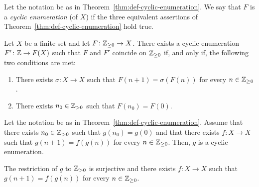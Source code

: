 Let the notation be as in Theorem~\ref{thm:def-cyclic-enumeration}.
We say that $F$ is a \emph{cyclic enumeration} (of $X$)
if the three equivalent assertions of Theorem~\ref{thm:def-cyclic-enumeration} hold true.



\begin{theorem}
  Let $X$ be a finite set and let $F\colon \mathbb{Z}_{\ge 0} \to X$.
  There exists a cyclic enumeration $F' \colon \mathbb{Z} \to F(X)$ such that $F$ and $F'$ coincide on $\mathbb{Z}_{\ge 0}$
  if, and only if, the following two conditions are met:
  \begin{enumerate}
  \item There exists $\sigma \colon X \to X$ such that $F(n + 1) = \sigma(F(n))$ for every $n \in \mathbb{Z}_{\ge 0}$.
  \item There exists $n_0 \in \mathbb{Z}_{> 0}$ such that $F(n_0) = F(0)$.
  \end{enumerate} 
\end{theorem} 






 \begin{theorem}
   Let the notation be as in Theorem~\ref{thm:def-cyclic-enumeration}.
   Assume that 
   there exists $n_0 \in \mathbb{Z}_{> 0}$ such that $g(n_0) = g(0)$ and 
   that there exists $f\colon X \to X$ such that $g(n + 1) = f(g(n))$ for every $n \in \mathbb{Z}_{\ge 0}$.
   Then, $g$ is a cyclic enumeration. 
\end{theorem}


    The restriction of $g$ to $\mathbb{Z}_{> 0}$ is surjective and  
    there exists $f\colon X \to X$ such that $g(n + 1) = f(g(n))$ for every $n \in \mathbb{Z}_{\ge 0}$.

